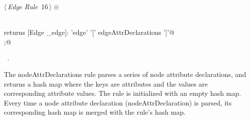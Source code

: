 \documentclass[a4paper]{report}
\begin{document}
\begin{flushleft} \small
\begin{minipage}{\linewidth}\label{scrap16}\raggedright\small
{} $\langle\,${\itshape Edge Rule}\nobreak\ {\footnotesize {16}}$\,\rangle\equiv$
\vspace{-1ex}
\begin{list}{}{} \item
\mbox{}\verb@@\\
\mbox{}\verb@edge returns [Edge _edge]: 'edge' '[' edgeAttrDeclarations ']'@\\
\mbox{};@\\
\mbox{}\verb@@{\NWsep}
\end{list}
\vspace{-1.5ex}
\footnotesize
\begin{list}{}{\setlength{\itemsep}{-\parsep}\setlength{\itemindent}{-\leftmargin}}
\item \NWtxtMacroRefIn\ .

\item{}
\end{list}
\end{minipage}\vspace{4ex}
\end{flushleft}
The nodeAttrDeclarations rule parses a series of node attribute declarations, and returns a hash map where the keys are attributes and the values are corresponding attribute values. The rule is initialized with an empty hash map. Every time a node attribute declaration (nodeAttrDeclaration) is parsed, its corresponding hash map is merged with the rule's hash map.
\end{document}
